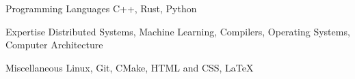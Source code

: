 
\begin{cvskills}

  \cvskill
    {Programming Languages}
    {C++, Rust, Python}

  \cvskill
    {Expertise}
    {Distributed Systems, Machine Learning, Compilers, Operating Systems,
    Computer Architecture}

  \cvskill
    {Miscellaneous}
    {Linux, Git, CMake, HTML and CSS, \LaTeX}

\end{cvskills}
